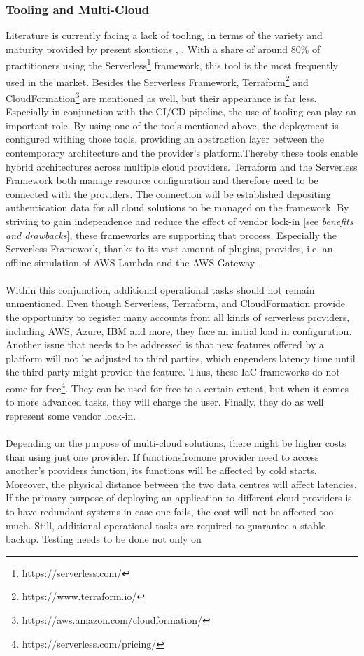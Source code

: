 \documentclass[a4paper,twoside,11pt, pagesize]{scrartcl}
\begin{document}
\begin{spacing}{1.2}
\subsubsection{Tooling and Multi-Cloud}
Literature is currently facing a lack of tooling, in terms of the variety and maturity provided by present sloutions \cite{Yussupov2019_SystematicMappingStudyFaaS}, \cite{leitner2019mixed}. With a share of around 80\% \cite{leitner2019mixed} of practitioners using the Serverless\footnote{https://serverless.com/} framework, this tool is the most frequently used in the market. Besides the Serverless Framework, Terraform\footnote{https://www.terraform.io/} and CloudFormation\footnote{https://aws.amazon.com/cloudformation/} are mentioned as well, but their appearance is far less. Especially in conjunction with the CI/CD pipeline, the use of tooling can play an important role. By using one of the tools mentioned above, the deployment is configured withing those tools, providing an abstraction layer between the contemporary architecture and the provider's platform.Thereby these tools enable hybrid architectures across multiple cloud providers. Terraform and the Serverless Framework both manage resource configuration and therefore need to be connected with the providers. The connection will be established depositing authentication data for all cloud solutions to be managed on the framework. By striving to gain independence and reduce the effect of vendor lock-in [see \textit{benefits and drawbacks}], these frameworks are supporting that process. Especially the Serverless Framework, thanks to its vast amount of plugins, provides, i.e. an offline simulation of AWS Lambda and the AWS Gateway \cite{lin2018tracking}.\\\\ Within this conjunction, additional operational tasks should not remain unmentioned. Even though Serverless, Terraform, and CloudFormation provide the opportunity to register many accounts from all kinds of serverless providers, including AWS, Azure, IBM and more, they face an initial load in configuration. Another issue that needs to be addressed is that new features offered by a platform will not be adjusted to third parties, which engenders latency time until the third party might provide the feature. Thus, these IaC frameworks do not come for free\footnote{https://serverless.com/pricing/}. They can be used for free to a certain extent, but when it comes to more advanced tasks, they will charge the user. Finally, they do as well represent some vendor lock-in.\\\\ Depending on the purpose of multi-cloud solutions, there might be higher costs than using just one provider. If functionsfromone provider need to access another's providers function, its functions will be affected by cold starts. Moreover, the physical distance between the two data centres will affect latencies. If the primary purpose of deploying an application to different cloud providers is to have redundant systems in case one fails, the cost will not be affected too much. Still, additional operational tasks are required to guarantee a stable backup. Testing needs to be done not only on 
\end{spacing}
\end{document}
